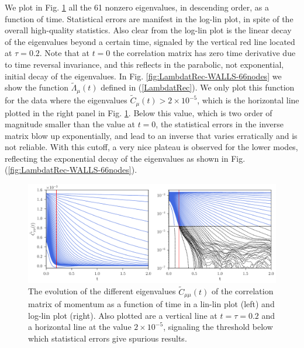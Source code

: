 \documentclass[b5paper,openright,10pt]{book}
\begin{document}
We plot in Fig.  \ref{fig:CtRec-WALLS-66nodes-exp}  all the 61 nonzero eigenvalues, in
descending  order,  as a  function  of  time. Statistical  errors  are
manifest in  the log-lin  plot, in spite  of the  overall high-quality
statistics. Also  clear from the log-lin  plot is the linear  decay of
the eigenvalues  beyond a certain  time, signaled by the  vertical red
line  located at  $\tau=0.2$.   Note that  at  $t=0$ the  correlation
matrix has zero  time derivative due to time  reversal invariance, and
this reflects in the parabolic,  not exponential, initial decay of the
eigenvalues.  In Fig.  \ref{fig:LambdatRec-WALLS-66nodes}  we show
the      function      $\tilde{\Lambda}_{\mu}(t)$      defined      in
(\ref{LambdatRec}). We only plot this  function for the data where the
eigenvalues   $\tilde{C}_{\mu}(t)>2\times10^{-5}$,    which   is   the
horizontal line plotted in the right panel in Fig.  \ref{fig:CtRec-WALLS-66nodes-exp}.  Below this value, which is
two  order  of  magnitude  smaller   than  the  value  at  $t=0$,  the
statistical errors  in the inverse  matrix blow up  exponentially, and
lead to an inverse that varies  erratically and is not reliable.  With
this cutoff,  a very  nice plateau  is observed  for the  lower modes,
reflecting the  exponential decay of  the eigenvalues as shown  in Fig. (\ref{fig:LambdatRec-WALLS-66nodes}).

\begin{figure}[h!]
  \centering
  \includegraphics[width=\linewidth]{CtRec-WALLS-66nodes-exp}
  \caption[Evolution of different eigenvalues $\tilde{C}_{\mu\nu}(t)$ for a confined fluid - Thin bins]{
  The  evolution of  the different
  eigenvalues  $\tilde{C}_{\mu\mu}(t)$ of  the  correlation matrix  of
  momentum  as  a  function  of   time  in  a  lin-lin  plot  (left)
  and   log-lin   plot
  (right). Also  plotted are  a vertical line  at $t=\tau=0.2$  and a
  horizontal  line  at  the   value  $2\times10^{-5}$,  signaling  the
  threshold below which statistical errors give spurious results. }
\label{fig:CtRec-WALLS-66nodes-exp}
\end{figure}
\end{document}
